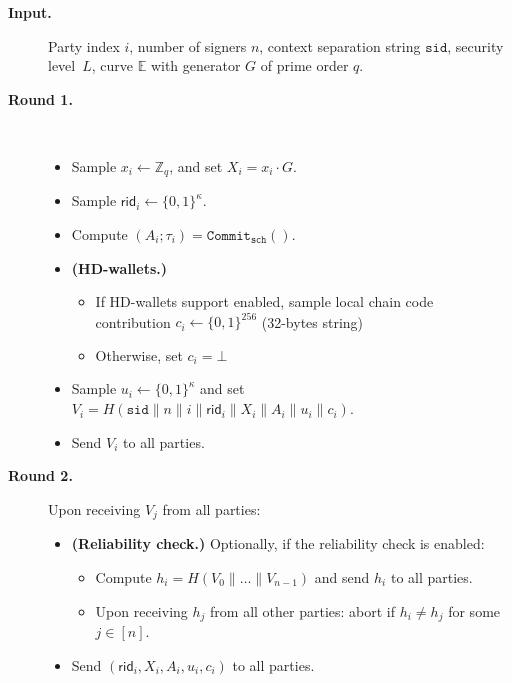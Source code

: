 \documentclass[11pt]{article}
\newcommand{\sid}{\ensuremath{\mathtt{sid}}}
\newcommand{\commit}[1]{\ensuremath{\mathtt{Commit}_{\mathtt{#1}}}}
\newcommand{\rid}{\textsf{rid}}
\newcommand{\E}{\mathbb{E}}
\newcommand{\Z}{\mathbb{Z}}
\newcommand{\?}[1]{\stackrel{?}{#1}}
\begin{document}
\begin{description}
\item[\bf Input.]
    Party index $i$,
    number of signers $n$,
    context separation string \sid,
    security level~$L$,
    curve $\E$ with generator $G$ of prime order $q$.

\item[\bf Round 1.] \
\begin{itemize}
    \item Sample $x_i \gets \Z_q$, 
          and set $X_i = x_i \cdot G$.
    \item Sample $\rid_i \gets \{0,1\}^\kappa$.
    \item Compute $(A_i; \tau_i) = \commit{sch}()$.
    \item {\bf (HD-wallets.)} 
    \begin{itemize}
      \item If HD-wallets support enabled, sample local chain code contribution $c_i \gets \{0,1\}^{256}$ (32-bytes string)
      \item Otherwise, set $c_i = \bot$
    \end{itemize}
    \item Sample $u_i \gets \{0,1\}^\kappa$
          and set $V_i = H(\sid \| n \| i \| \rid_i \| X_i \| A_i \| u_i \| c_i)$.
    \item Send $V_i$ to all parties.
\end{itemize}

\item[\bf Round 2.] Upon receiving $V_j$ from all parties:
\begin{itemize}
    \item {\bf (Reliability check.)} Optionally, if the reliability check is enabled:
\begin{itemize}
    \item Compute $h_i = H(V_0 \| \dots \| V_{n-1})$ and
        send $h_i$ to all parties.
    
    \item Upon receiving $h_j$ from all other parties: abort if $h_i \neq h_j$ for some $j\in [n]$.
\end{itemize}
    \item Send $(\rid_i, X_i, A_i, u_i, c_i)$ to all parties.
    \end{itemize}


\end{description}
\end{document}
